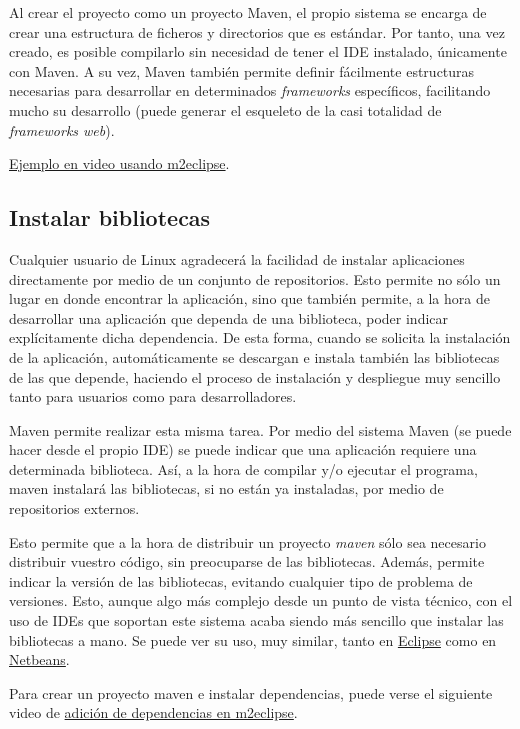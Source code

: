 \documentclass[11pt]{article}
\begin{document}
Al crear el proyecto como un proyecto Maven, el propio sistema se encarga de
crear una estructura de ficheros y directorios que es estándar. Por tanto, una
vez creado, es posible compilarlo sin necesidad de tener el IDE instalado,
únicamente con Maven. A su vez, Maven también permite definir
fácilmente estructuras necesarias para desarrollar en determinados
\emph{frameworks} específicos, facilitando mucho su desarrollo (puede generar el esqueleto
de la casi totalidad de \emph{frameworks web}).

\href{http://www.youtube.com/watch?v=5Tp3XCEfMGk}{Ejemplo en video usando
m2eclipse}.


\subsection{Instalar bibliotecas} \label{sec-5-2}

Cualquier usuario de Linux agradecerá la facilidad de instalar aplicaciones
directamente por medio de un conjunto de repositorios. Esto permite no sólo un
lugar en donde encontrar la aplicación, sino que también permite, a la hora de
desarrollar una aplicación que dependa de una biblioteca, poder indicar explícitamente dicha
dependencia. De esta forma, cuando se solicita la instalación de la aplicación,
automáticamente se descargan e instala también las bibliotecas de las que
depende, haciendo el proceso de instalación y despliegue muy sencillo tanto para usuarios
como para desarrolladores.

Maven permite realizar esta misma tarea. Por medio del sistema Maven (se puede
hacer desde el propio IDE) se puede indicar que una aplicación requiere una
determinada biblioteca. Así, a la hora de compilar y/o ejecutar el programa,
maven instalará las bibliotecas, si no están ya instaladas, por medio de
repositorios externos.

Esto permite que a la hora de distribuir un proyecto \emph{maven} sólo sea
necesario distribuir vuestro código, sin preocuparse de las bibliotecas. Además, permite indicar la versión de las bibliotecas, evitando cualquier tipo de problema de versiones. Esto, aunque algo más complejo desde un punto de vista técnico, con el uso de IDEs que soportan este sistema acaba
siendo más sencillo que instalar las bibliotecas a mano. Se puede ver su uso, muy similar, tanto en
\href{http://m2eclipse.sonatype.org/adding-project-dependencies-in-m2eclipse.html}{Eclipse}
como en \href{http://wiki.netbeans.org/MavenBestPractices}{Netbeans}. 

Para crear un proyecto maven e instalar dependencias, puede verse el siguiente video de
\href{http://www.youtube.com/watch?v=IRKu8_l5YiQ}{adición de dependencias en m2eclipse}.
\end{document}
